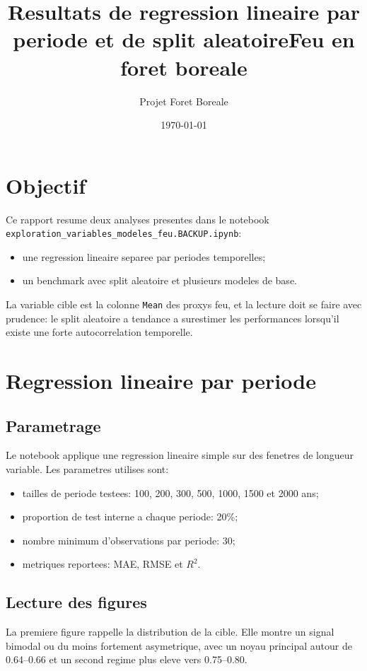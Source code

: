 \documentclass[11pt,a4paper]{article}
\title{Resultats de regression lineaire par periode et de split aleatoire\newline Feu en foret boreale}
\author{Projet Foret Boreale}
\date{\today}
\begin{document}
\maketitle

\section{Objectif}
Ce rapport resume deux analyses presentes dans le notebook \texttt{exploration\_variables\_modeles\_feu.BACKUP.ipynb}:
\begin{itemize}
\item une regression lineaire separee par periodes temporelles;
\item un benchmark avec split aleatoire et plusieurs modeles de base.
\end{itemize}

La variable cible est la colonne \texttt{Mean} des proxys feu, et la lecture doit se faire avec prudence: le split aleatoire a tendance a surestimer les performances lorsqu'il existe une forte autocorrelation temporelle.

\section{Regression lineaire par periode}

\subsection{Parametrage}
Le notebook applique une regression lineaire simple sur des fenetres de longueur variable. Les parametres utilises sont:
\begin{itemize}
\item tailles de periode testees: 100, 200, 300, 500, 1000, 1500 et 2000 ans;
\item proportion de test interne a chaque periode: 20\%;
\item nombre minimum d'observations par periode: 30;
\item metriques reportees: MAE, RMSE et $R^2$.
\end{itemize}

\subsection{Lecture des figures}
La premiere figure rappelle la distribution de la cible. Elle montre un signal bimodal ou du moins fortement asymetrique, avec un noyau principal autour de 0.64--0.66 et un second regime plus eleve vers 0.75--0.80.
\end{document}
